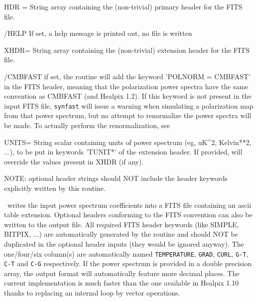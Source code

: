 \begin{keywords}
  \begin{kwlist}{} %
    \item[HDR =] String array containing the (non-trivial) primary header
      for the FITS file. 
    \item[/HELP] If set, a help message is printed out, no file is written

    \item[XHDR=] String array containing the (non-trivial) extension header
      for the FITS file. 
    \item[/CMBFAST] if set, the routine will add the keyword 'POLNORM =
    CMBFAST' in the FITS header, meaning that the polarization power spectra
    have the same convention as CMBFAST (and Healpix 1.2). 
    If this keyword is not present in the input FITS file, {\tt synfast} will issue a
    warning when simulating a polarization map from that power spectrum, but no
    attempt to renormalize the power spectra will be made. To actually perform
    the renormalization, see 
    \item[UNITS=] String scalar containing units of power spectrum (eg, uK{\^{}}2,
         Kelvin**2, ...), to be put in keywords 'TUNIT*' of the extension header. 
         If provided, will override the values present in XHDR (if any).
    \item[ ] NOTE: optional header strings should NOT include the
      header keywords explicitly written by this routine.

  \end{kwlist}
\end{keywords}  

\begin{codedescription}
{\thedocid\ writes the input power spectrum coefficients into a FITS
file containing an ascii table extension. Optional headers conforming
to the FITS convention can also be written to the output file. All
required FITS header keywords (like SIMPLE, BITPIX, ...) are automatically generated by the
routine and should NOT be duplicated in the optional header inputs
(they would be ignored anyway).
The one/four/six column(s) are automatically named 
{\tt TEMPERATURE}, {\tt GRAD}, {\tt CURL}, {\tt G-T}, {\tt C-T} and {\tt C-G}
respectively.
If the power spectrum is provided in a double precision array, the output format
will automatically feature more decimal places.
The current implementation is much faster than the one available in
Healpix 1.10 thanks to replacing an internal loop by vector operations.}
\end{codedescription}



